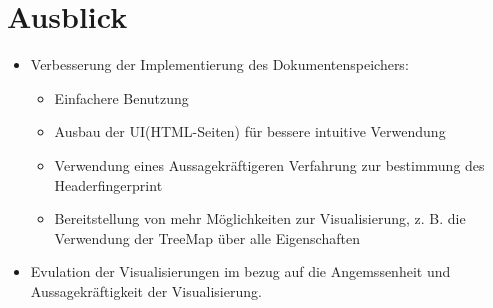 \documentclass[
    fontsize=12pt,
    headings=small,
    parskip=half,           %
    bibliography=totoc,
    numbers=noenddot,       %
    open=any,               %
    ]{scrreprt}
\begin{document}
\section{Ausblick}
\begin{itemize}
\item Verbesserung der Implementierung des Dokumentenspeichers: 
    \begin{itemize}
    \item Einfachere Benutzung
    \item Ausbau der UI(HTML-Seiten) für bessere intuitive Verwendung
    \item Verwendung eines Aussagekräftigeren Verfahrung zur bestimmung des Headerfingerprint
    \item Bereitstellung von mehr Möglichkeiten zur Visualisierung, z. B. die Verwendung der TreeMap über alle Eigenschaften 
    \end{itemize}
\item Evulation der Visualisierungen im bezug auf die Angemssenheit und Aussagekräftigkeit der Visualisierung.
\end{itemize}
\end{document}
